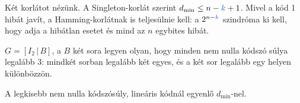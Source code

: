 \begin{center}\end{center}

Két korlátot nézünk. A Singleton-korlát szerint $d_{\min}\le n-{\ca{k}}+1$. Mivel a kód 1 hibát javít, a Hamming-korlátnak is teljesülnie kell: a $2^{n-{\ca{k}}}$ szindróma ki kell, hogy adja a hibátlan esetet és mind az $n$ egybites hibát.

\begin{center}\end{center}

\begin{center}\end{center}

$G=[I_2\,|\,B]$, a $B$ két sora legyen olyan, hogy minden nem nulla kódszó súlya legalább 3: mindkét sorban legalább két egyes, és a két sor legalább egy helyen különbözzön.

\begin{center}\end{center}

\begin{center}\end{center}

A legkisebb nem nulla kódszósúly, lineáris kódnál egyenlő $d_{\min}$-nel.

\begin{center}\end{center}
\begin{eredmeny}

\begin{center}\end{center}
\end{eredmeny}


